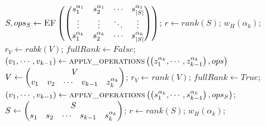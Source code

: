 \documentclass[11pt]{llncs}
\begin{document}
\newpage
\begin{algorithm}
	\begin{algorithmic}
		\State $S, ops_S \gets \mbox{\textsc{EF}}\left(
		\begin{pmatrix}
		s_1^{\alpha_1} &  s_2^{\alpha_1} & \cdots & s_{|S|}^{\alpha_{1}}\\
		\vdots &  \vdots & \ddots & \vdots\\
		s_{1}^{\alpha_k} &  s_{2}^{\alpha_k} & \cdots & s_{|S|}^{\alpha_{k}}\\
		\end{pmatrix}\right)$;
		\State $r \gets rank(S)$;
		\State \Return $w_H\left(\alpha_k\right)$;
		\EndIf
		\State $r_V \gets rabk(V)$;
		\State $fullRank \gets False$;
		\State $\left(v_1, \cdots, v_{k-1}\right) \gets \mbox{\textsc{apply\_operations}}\left(\left(z_1^{\alpha_k}, \cdots, z_{k-1}^{\alpha_k}\right), ops\right)$ 
		\State $V \gets \begin{pmatrix}
			\multicolumn{5}{c}{\multirow{1}{*}{$V$}} \\
			v_1 & v_2 & \cdots & v_{k-1} & z_{k}^{\alpha_k}
		\end{pmatrix}$;
		\State $r_V \gets rank(V)$;
		\State $fullRank \gets True$;
		\EndIf
		\State $\left(v_1, \cdots, v_{k-1}\right) \gets \mbox{\textsc{apply\_operations}}\left(\left(s_1^{\alpha_k}, \cdots, s_{k-1}^{\alpha_k}\right), ops_S\right)$;
		\State $S \gets \begin{pmatrix}
		\multicolumn{5}{c}{\multirow{1}{*}{$S$}} \\
		s_1 & s_2 & \cdots & s_{k-1} & s_{k}^{\alpha_k}
		\end{pmatrix}$;
		\State $r \gets rank(S)$;
		\State \Return $w_H\left(\alpha_k\right)$;
		\EndIf
		\EndWhile
	\end{algorithmic}
\end{algorithm}
\end{document}

